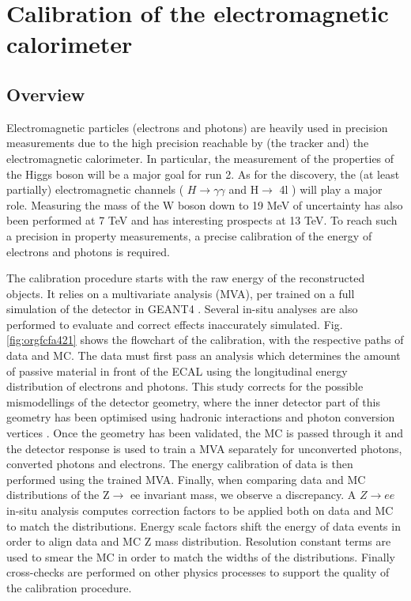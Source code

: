 \chapter{Calibration of the electromagnetic calorimeter}
\label{sec:org3ad4877}
\label{sec:Calibration_calibration}
\section{Overview}
\label{sec:orgd33fdfe}

Electromagnetic particles (electrons and photons) are heavily used in precision measurements due to the high precision reachable by (the tracker and) the electromagnetic calorimeter.
In particular, the measurement of the properties of the Higgs boson will be a major goal for run 2.
As for the discovery, the (at least partially) electromagnetic channels ( $H\rightarrow\gamma \gamma$ and H\(\rightarrow\) 4l ) will play a major role.
Measuring the mass of the W boson down to 19 MeV of uncertainty has also been performed at 7 TeV \cite{CERN-EP-2016-305} and has interesting prospects at 13 TeV.
To reach such a precision in property measurements, a precise calibration of the energy of electrons and photons is required.

The calibration procedure starts with the raw energy of the reconstructed objects.
It relies on a multivariate analysis (MVA), per trained on a full simulation of the detector in GEANT4 \cite{GEANT4}.
Several in-situ analyses are also performed to evaluate and correct effects inaccurately simulated.
Fig. \ref{fig:orgfcfa421} shows the flowchart of the calibration, with the respective paths of data and MC.
The data must first pass an analysis which determines the amount of passive material in front of the ECAL using the longitudinal energy distribution of electrons and photons.
This study corrects for the possible mismodellings of the detector geometry, where the inner detector part of this geometry has been optimised using hadronic interactions and photon conversion vertices \cite{CERN-EP-2017-081}.
Once the geometry has been validated, the MC is passed through it and the detector response is used to train a MVA separately for unconverted photons, converted photons and electrons.
The energy calibration of data is then performed using the trained MVA.
Finally, when comparing data and MC distributions of the Z\(\rightarrow\) ee invariant mass, we observe a discrepancy.
A $Z\rightarrow ee$ in-situ analysis computes correction factors to be applied both on data and MC to match the distributions.
Energy scale factors shift the energy of data events in order to align data and MC Z mass distribution.
Resolution constant terms are used to smear the MC in order to match the widths of the distributions.
Finally cross-checks are performed on other physics processes to support the quality of the calibration procedure.

